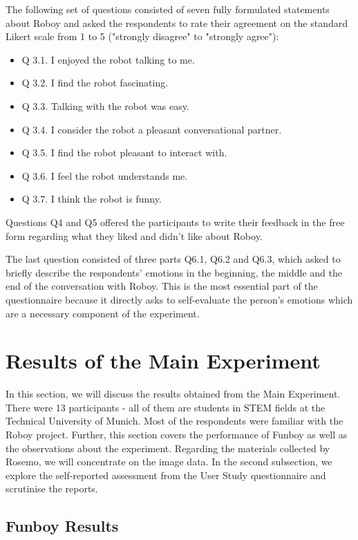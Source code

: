 The following set of questions consisted of seven fully formulated statements about Roboy and asked the respondents to rate their agreement on the standard Likert scale from 1 to 5 ("strongly disagree" to "strongly agree"):
\begin{itemize}
    \item Q 3.1. I enjoyed the robot talking to me.
    \item Q 3.2. I find the robot fascinating.
    \item Q 3.3. Talking with the robot was easy.
    \item Q 3.4. I consider the robot a pleasant conversational partner.
    \item Q 3.5. I find the robot pleasant to interact with.
    \item Q 3.6. I feel the robot understands me.
    \item Q 3.7. I think the robot is funny.
\end{itemize}

Questions Q4 and Q5 offered the participants to write their feedback in the free form regarding what they liked and didn't like about Roboy.

The last question consisted of three parts Q6.1, Q6.2 and Q6.3, which asked to briefly describe the respondents' emotions in the beginning, the middle and the end of the conversation with Roboy. This is the most essential part of the questionnaire because it directly asks to self-evaluate the person's emotions which are a necessary component of the experiment.

\section{Results of the Main Experiment}

In this section, we will discuss the results obtained from the Main Experiment. There were 13 participants - all of them are students in STEM fields at the Technical University of Munich. Most of the respondents were familiar with the Roboy project. Further, this section covers the performance of Funboy as well as the observations about the experiment. Regarding the materials collected by Rosemo, we will concentrate on the image data. In the second subsection, we explore the self-reported assessment from the User Study questionnaire and scrutinise the reports.

\subsection{Funboy Results}

